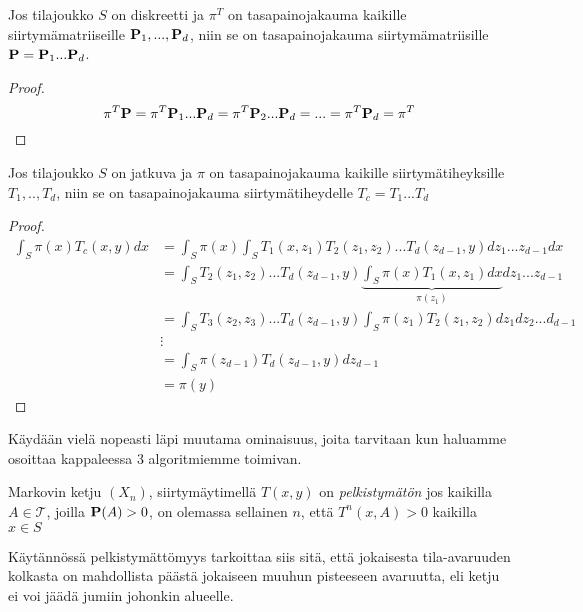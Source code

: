 \begin{lause}\label{cyclic-kernel}
	Jos tilajoukko $S$ on diskreetti ja $\pi^T$ on tasapainojakauma kaikille siirtymämatriiseille $\textbf{P}_1,...,\textbf{P}_d$, niin se on tasapainojakauma siirtymämatriisille $\textbf{P} = \textbf{P}_1...\textbf{P}_d$.
\end{lause}
\begin{proof}
	\begin{equation*}
		\pi^T \textbf{P} = \pi^T \textbf{P}_1...\textbf{P}_d = \pi^T \textbf{P}_2...\textbf{P}_d = ... = \pi^T \textbf{P}_d = \pi^T
	\end{equation*}
\end{proof}

\begin{lause}
	Jos tilajoukko $S$ on jatkuva ja $\pi$ on tasapainojakauma kaikille siirtymätiheyksille $T_1,..,T_d$, niin se on tasapainojakauma siirtymätiheydelle $T_c=T_1...T_d$
\end{lause}

\begin{proof}
	\begin{equation}
		\begin{split}
			\int_S \pi(x) T_c(x,y)dx &= \int_S \pi(x) \int_ST_1(x,z_1)T_2(z_1,z_2)...T_d(z_{d-1},y)dz_1...z_{d-1}dx \\
			&= \int_S T_2(z_1,z_2)...T_d(z_{d-1},y) \underbrace{\int_S \pi(x) T_1(x,z_1)dx}_{\pi(z_1)} dz_1...z_{d-1}\\
			&= \int_S T_3(z_2,z_3)...T_d(z_{d-1},y) \int_S \pi(z_1)T_2(z_1,z_2)dz_1 dz_2...d_{d-1} \\
			& \vdots \\
			&= \int_S \pi(z_{d-1})T_d(z_{d-1},y)dz_{d-1} \\
			&= \pi(y)
		\end{split}
	\end{equation}
\end{proof}


Käydään vielä nopeasti läpi muutama ominaisuus, joita tarvitaan kun haluamme osoittaa kappaleessa 3 algoritmiemme toimivan.

\begin{maar}
	Markovin ketju $(X_n)$, siirtymäytimellä $T(x,y)$ on \textit{pelkistymätön} jos kaikilla $A \in \mathcal{T}$, joilla $\textbf{P}(A)>0$, on olemassa sellainen $n$, että $T^n(x, A)>0$ kaikilla $x\in S$
\end{maar} 

Käytännössä pelkistymättömyys tarkoittaa siis sitä, että jokaisesta tila-avaruuden kolkasta on mahdollista päästä jokaiseen muuhun pisteeseen avaruutta, eli ketju ei voi jäädä jumiin johonkin alueelle.

